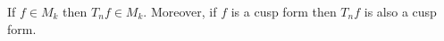 If $f \in M_k$ then $T_n f \in M_k$. Moreover, if $f$ is a cusp form then $T_n f$ is also a cusp form.
